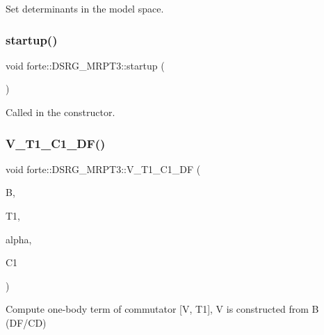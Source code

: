 Set determinants in the model space. 

\mbox{\label{classforte_1_1_d_s_r_g___m_r_p_t3_ae03d4e96612c876c0d9f0715f93316fe}} 
\subsubsection{\texorpdfstring{startup()}{startup()}}
{\footnotesize\ttfamily void forte\+::\+D\+S\+R\+G\+\_\+\+M\+R\+P\+T3\+::startup (\begin{DoxyParamCaption}{ }\end{DoxyParamCaption})\hspace{0.3cm}{\ttfamily [protected]}}



Called in the constructor. 

\mbox{\label{classforte_1_1_d_s_r_g___m_r_p_t3_a0a5a5e4a7f71dd0fb364b184fb0e65b5}} 
\subsubsection{\texorpdfstring{V\+\_\+\+T1\+\_\+\+C1\+\_\+\+D\+F()}{V\_T1\_C1\_DF()}}
{\footnotesize\ttfamily void forte\+::\+D\+S\+R\+G\+\_\+\+M\+R\+P\+T3\+::\+V\+\_\+\+T1\+\_\+\+C1\+\_\+\+DF (\begin{DoxyParamCaption}\item[{Blocked\+Tensor \&}]{B,  }\item[{Blocked\+Tensor \&}]{T1,  }\item[{const double \&}]{alpha,  }\item[{Blocked\+Tensor \&}]{C1 }\end{DoxyParamCaption})\hspace{0.3cm}{\ttfamily [protected]}}



Compute one-\/body term of commutator \mbox{[}V, T1\mbox{]}, V is constructed from B (D\+F/\+CD) 

